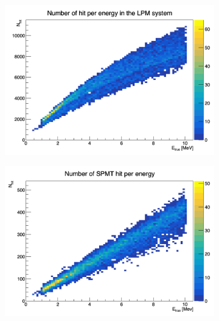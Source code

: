 \documentclass[../main.tex]{subfiles}
\begin{document}
\begin{figure}[ht]
  \centering
  \begin{subfigure}[t]{0.32\linewidth}
    \centering
    \includegraphics[width=\linewidth]{images/jgnn/lpmt_hit_e.png}
    \caption{}
    \label{fig:jgnn:lpmt_hit_e}
  \end{subfigure}
  \begin{subfigure}[t]{0.32\linewidth}
    \centering
    \includegraphics[width=\linewidth]{images/jgnn/spmt_hit_e.png}
    \caption{}
    \label{fig:jgnn:spmt_hit_e}
  \end{subfigure}
  \begin{subfigure}[t]{0.32\linewidth}
    \centering

\end{subfigure}
\end{figure}
\end{document}
